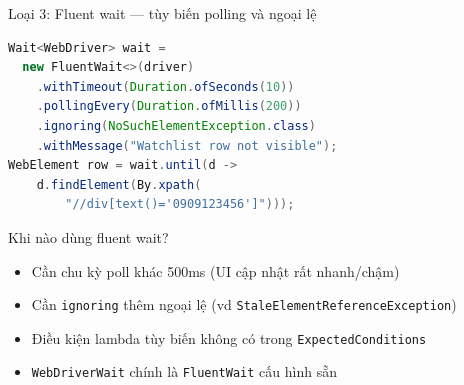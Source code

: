 \documentclass[aspectratio=169,12pt]{beamer}
\begin{document}
\begin{frame}[fragile]{Loại 3: Fluent wait --- tùy biến polling và ngoại lệ}
\begin{lstlisting}[language=Java,basicstyle=\ttfamily\scriptsize]
Wait<WebDriver> wait =
  new FluentWait<>(driver)
    .withTimeout(Duration.ofSeconds(10))
    .pollingEvery(Duration.ofMillis(200))
    .ignoring(NoSuchElementException.class)
    .withMessage("Watchlist row not visible");
WebElement row = wait.until(d ->
    d.findElement(By.xpath(
        "//div[text()='0909123456']")));
\end{lstlisting}

  \begin{block}{Khi nào dùng fluent wait?}
    \begin{itemize}
      \item Cần chu kỳ poll khác 500ms (UI cập nhật rất nhanh/chậm)
      \item Cần \texttt{ignoring} thêm ngoại lệ
            (vd \texttt{StaleElementReferenceException})
      \item Điều kiện lambda tùy biến không có trong
            \texttt{ExpectedConditions}
    \end{itemize}
  \end{block}
  \begin{itemize}
    \item \texttt{WebDriverWait} chính là \texttt{FluentWait} cấu hình sẵn
  \end{itemize}
\end{frame}
\end{document}
